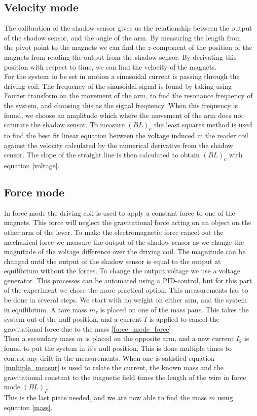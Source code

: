 \documentclass[english,a4paper,12pt,reprint]{revtex4-1}
\begin{document}
\subsection{Velocity mode}
The calibration of the shadow sensor gives us the relationship between the output of the shadow sensor, and the angle of the arm. By measuring the length from the pivot point to the magnets we can find the $z$-component of the position of the magnets from reading the output from the shadow sensor. By derivating this position with respect to time, we can find the velocity of the magnets. \\
For the system to be set in motion a sinusoidal current is passing through the driving coil. The frequency of the sinusoidal signal is found by taking using Fourier transform on the movement of the arm, to find the resonance frequency of the system, and choosing this as the signal frequency. When this frequency is found, we choose an amplitude which where the movement of the arm does not saturate the shadow sensor. To measure $\left(BL\right)_v$ the least squares method is used to find the best fit linear equation between the voltage induced in the reader coil against the velocity calculated by the numerical derivative from the shadow sensor. The slope of the straight line is then calculated to obtain  $\left(BL\right)_v$ with equation \eqref{voltage}.



\subsection{Force mode}
In force mode the driving coil is used to apply a constant force to one of the magnets. This force will neglect the gravitational force acting on an object on the other arm of the lever. To make the electromagnetic force cancel out the mechanical force we measure the output of the shadow sensor as we change the magnitude of the voltage difference over the driving coil. The magnitude can be changed until the output of the shadow sensor is equal to the output at equilibrium without the forces. To change the output voltage we use a voltage generator. This processes can be automated using a PID-control, but for this part of the experiment we chose the more practical option.
This measurements has to be done in several steps. We start with no weight on either arm, and the system in equilibrium. A tare mass $m_\tau$ is placed on one of the mass pans. This takes the system out of the null-position, and a current $I$ is applied to cancel the gravitational force due to the mass \eqref{force_mode_force}. \\
Then a secondary mass $m$ is placed on the opposite arm, and a new current $I_2$ is found to put the system in it's null position. This is done multiple times to control any drift in the measurements. When one is satisfied equation \eqref{multiple_measur} is used to relate the current, the known mass and the gravitational constant to the magnetic field times the length of the wire in force mode $(BL)_F$.\\
This is the last piece needed, and we are now able to find the mass $m$ using equation \eqref{mass}.
\end{document}
